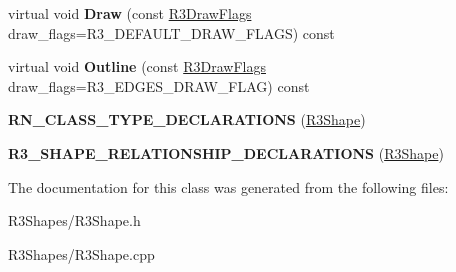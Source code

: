 \begin{DoxyCompactItemize}
\item 
virtual void {\bfseries Draw} (const \hyperlink{class_r_n_flags}{R3\+Draw\+Flags} draw\+\_\+flags=R3\+\_\+\+D\+E\+F\+A\+U\+L\+T\+\_\+\+D\+R\+A\+W\+\_\+\+F\+L\+A\+GS) const \hypertarget{class_r3_shape_a03ceca3e76e0eddfc2e23cef6b3facb3}{}\label{class_r3_shape_a03ceca3e76e0eddfc2e23cef6b3facb3}

\item 
virtual void {\bfseries Outline} (const \hyperlink{class_r_n_flags}{R3\+Draw\+Flags} draw\+\_\+flags=R3\+\_\+\+E\+D\+G\+E\+S\+\_\+\+D\+R\+A\+W\+\_\+\+F\+L\+AG) const \hypertarget{class_r3_shape_a46a22d218a4b5d18a8b66ed99696a556}{}\label{class_r3_shape_a46a22d218a4b5d18a8b66ed99696a556}

\item 
{\bfseries R\+N\+\_\+\+C\+L\+A\+S\+S\+\_\+\+T\+Y\+P\+E\+\_\+\+D\+E\+C\+L\+A\+R\+A\+T\+I\+O\+NS} (\hyperlink{class_r3_shape}{R3\+Shape})\hypertarget{class_r3_shape_a9b42dc3ad6ff8453eb728e8b16d68000}{}\label{class_r3_shape_a9b42dc3ad6ff8453eb728e8b16d68000}

\item 
{\bfseries R3\+\_\+\+S\+H\+A\+P\+E\+\_\+\+R\+E\+L\+A\+T\+I\+O\+N\+S\+H\+I\+P\+\_\+\+D\+E\+C\+L\+A\+R\+A\+T\+I\+O\+NS} (\hyperlink{class_r3_shape}{R3\+Shape})\hypertarget{class_r3_shape_a5ea506a416bbb72dcae64f36431cef95}{}\label{class_r3_shape_a5ea506a416bbb72dcae64f36431cef95}

\end{DoxyCompactItemize}


The documentation for this class was generated from the following files\+:\begin{DoxyCompactItemize}
\item 
R3\+Shapes/R3\+Shape.\+h\item 
R3\+Shapes/R3\+Shape.\+cpp\end{DoxyCompactItemize}
